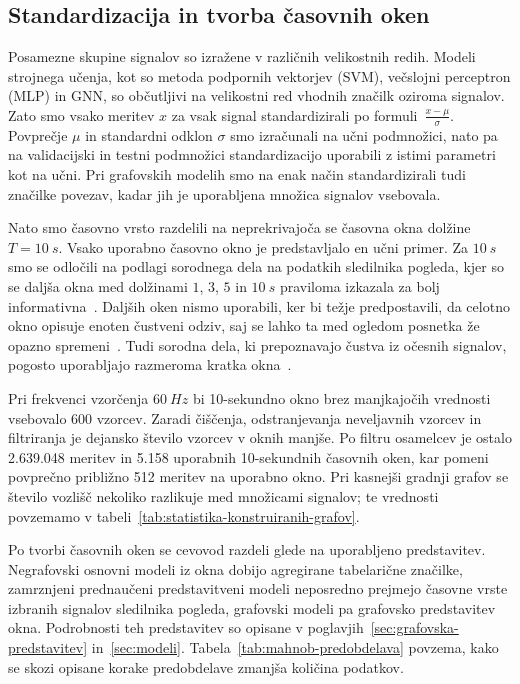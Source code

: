\subsection{Standardizacija in tvorba časovnih oken}
\label{subsec:standardizacija}

Posamezne skupine signalov so izražene v različnih velikostnih redih.
Modeli strojnega učenja, kot so metoda podpornih vektorjev (SVM), večslojni perceptron (MLP) in GNN, so občutljivi na velikostni red vhodnih značilk oziroma signalov.
Zato smo vsako meritev $x$ za vsak signal standardizirali po formuli~$\frac{x-\mu}{\sigma}$.
Povprečje $\mu$ in standardni odklon $\sigma$ smo izračunali na učni podmnožici, nato pa na validacijski in testni podmnožici standardizacijo uporabili z istimi parametri kot na učni.
Pri grafovskih modelih smo na enak način standardizirali tudi značilke povezav, kadar jih je uporabljena množica signalov vsebovala.

\label{subsec:windowing}

Nato smo časovno vrsto razdelili na neprekrivajoča se časovna okna dolžine $T=10~s$.
Vsako uporabno časovno okno je predstavljalo en učni primer.
Za $10~s$ smo se odločili na podlagi sorodnega dela na podatkih sledilnika pogleda, kjer so se daljša okna med dolžinami $1$, $3$, $5$ in $10~s$ praviloma izkazala za bolj informativna~\cite{bozak2024feature}.
Daljših oken nismo uporabili, ker bi težje predpostavili, da celotno okno opisuje enoten čustveni odziv, saj se lahko ta med ogledom posnetka že opazno spremeni~\cite{zhang2020rcea}.
Tudi sorodna dela, ki prepoznavajo čustva iz očesnih signalov, pogosto uporabljajo razmeroma kratka okna~\cite{wang2018automatic,wu2021emotion}.

Pri frekvenci vzorčenja $60~Hz$ bi 10-sekundno okno brez manjkajočih vrednosti vsebovalo 600 vzorcev.
Zaradi čiščenja, odstranjevanja neveljavnih vzorcev in filtriranja je dejansko število vzorcev v oknih manjše.
Po filtru osamelcev je ostalo 2.639.048 meritev in 5.158 uporabnih 10-sekundnih časovnih oken, kar pomeni povprečno približno 512 meritev na uporabno okno.
Pri kasnejši gradnji grafov se število vozlišč nekoliko razlikuje med množicami signalov; te vrednosti povzemamo v tabeli~\ref{tab:statistika-konstruiranih-grafov}.

Po tvorbi časovnih oken se cevovod razdeli glede na uporabljeno predstavitev.
Negrafovski osnovni modeli iz okna dobijo agregirane tabelarične značilke, zamrznjeni prednaučeni predstavitveni modeli neposredno prejmejo časovne vrste izbranih signalov sledilnika pogleda, grafovski modeli pa grafovsko predstavitev okna.
Podrobnosti teh predstavitev so opisane v poglavjih~\ref{sec:grafovska-predstavitev} in~\ref{sec:modeli}.
Tabela~\ref{tab:mahnob-predobdelava} povzema, kako se skozi opisane korake predobdelave zmanjša količina podatkov.
\newpage

